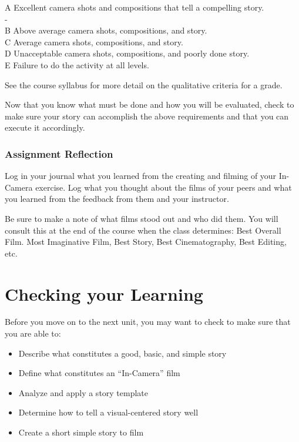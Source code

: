 \documentclass[
]{book}
\providecommand{\tightlist}{%
  \setlength{\itemsep}{0pt}\setlength{\parskip}{0pt}}
\begin{document}
\begin{assessment}
A \textbar{} Excellent camera shots and compositions that tell a compelling story. \textbar{}\\
- \textbar{} \textbar{}\\
B \textbar{} Above average camera shots, compositions, and story. \textbar{}\\
C \textbar{} Average camera shots, compositions, and story. \textbar{}\\
D \textbar{} Unacceptable camera shots, compositions, and poorly done story. \textbar{}\\
E \textbar{} Failure to do the activity at all levels. \textbar{}

See the course syllabus for more detail on the qualitative criteria for a grade.

Now that you know what must be done and how you will be evaluated, check to make sure your story can accomplish the above requirements and that you can execute it accordingly.

\hypertarget{assignment-reflection}{%
\subsubsection*{Assignment Reflection}\label{assignment-reflection}}

Log in your journal what you learned from the creating and filming of your In-Camera exercise. Log what you thought about the films of your peers and what you learned from the feedback from them and your instructor.

Be sure to make a note of what films stood out and who did them. You will consult this at the end of the course when the class determines: Best Overall Film. Most Imaginative Film, Best Story, Best Cinematography, Best Editing, etc.
\end{assessment}

\hypertarget{checking-your-learning-5}{%
\section*{Checking your Learning}\label{checking-your-learning-5}}

\begin{progress}
Before you move on to the next unit, you may want to check to make sure that you are able to:

\begin{itemize}
\tightlist
\item
  Describe what constitutes a good, basic, and simple story\\
\item
  Define what constitutes an ``In-Camera'' film\\
\item
  Analyze and apply a story template\\
\item
  Determine how to tell a visual-centered story well\\
\item
  Create a short simple story to film
\end{itemize}
\end{progress}
\end{document}
